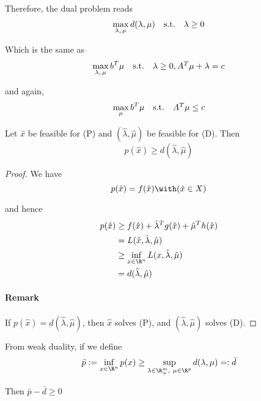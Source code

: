 Therefore, the dual problem reads
$$\begin{array}{l l l}\displaystyle
    \max_{\lambda,\,\mu}d(\lambda,\mu) & \text{s.t.} & \lambda\geq0
  \end{array}$$

Which is the same as
$$\begin{array}{l l l}\displaystyle
    \max_{\lambda,\,\mu}b^T\mu & \text{s.t.} & \lambda\geq0,A^T\mu+\lambda=c
  \end{array}$$

and again,
$$\begin{array}{l l l}\displaystyle
    \max_\mu b^T\mu & \text{s.t.} & A^T\mu\leq c
  \end{array}$$


\label{ad0b792}

Let $\hat x$ be feasible for (P) and $(\hat\lambda,\hat\mu)$ be feasible for
(D). Then
$$
  p(\hat x)\geq d(\hat\lambda,\hat\mu)
$$

\begin{proof}
  \def\hx{\hat x}
  \def\hl{\hat\lambda}
  \def\hm{\hat\mu}
  We have
  $$
    p(\hx) = f(\hx)\with(\hx\in X)
  $$

  and hence
  \begin{align*}
    p(\hx) & \geq f(\hx) + \hl^Tg(\hx) + \hm^Th(\hx) \\
           & =L(\hx,\hl,\hm)                         \\
           & \geq\inf_{x\in\R^n}L(x,\hl,\hm)         \\
           & = d(\hl,\hm)
  \end{align*}

  \paragraph{Remark} If $p(\hx)=d(\hl,\hm)$, then $\hx$ solves (P), and $(\hl,\hm)$ solves (D).
\end{proof}

From weak duality, if we define
\begin{align*}
  \bar p:=\inf_{x\in\R^n}p(x)\geq
  \sup_{\lambda\in\R^m_+,\ \mu\in\R^p}d(\lambda,\mu)
  =:\bar d
\end{align*}

Then $\bar p-\bar d\geq0$

\label{c4aaa1f}


